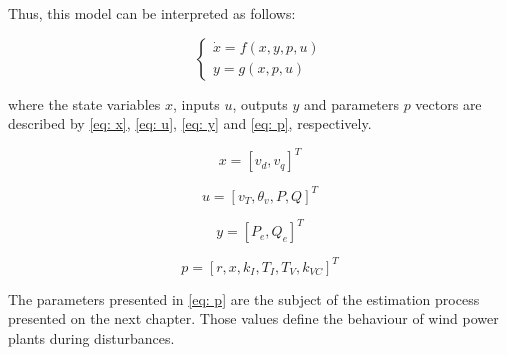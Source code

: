 Thus, this model can be interpreted as follows:

\begin{equation}
	\begin{cases}
		\dot{x} = f(x, y, p, u) \\
		y = g(x, p, u)
	\end{cases}
	\label{eq: xdot}
\end{equation}

\noindent where the state variables $x$, inputs $u$, outputs $y$ and parameters $p$ vectors are described by \eqref{eq: x}, \eqref{eq: u}, \eqref{eq: y} and \eqref{eq: p}, respectively.

\begin{equation}
	x = [v_{d}, v_{q}]^T
	\label{eq: x}
\end{equation}

\begin{equation}
	u = [v_{T}, \theta_{v}, P, Q]^T
	\label{eq: u}
\end{equation}

\begin{equation}
	y = [P_{e}, Q_{e}]^T
	\label{eq: y}
\end{equation}

\begin{equation}
	p = [r, x, k_{I}, T_{I}, T_{V}, k_{VC}]^T
	\label{eq: p}
\end{equation}

The parameters presented in \eqref{eq: p} are the subject of the estimation process presented on the next chapter. Those values define the behaviour of wind power plants during disturbances.